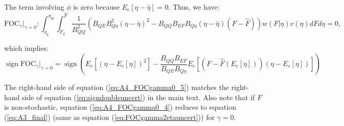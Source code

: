 \documentclass[12pt]{article}
\DeclareMathOperator{\sign}{sign}
\begin{document}
The term involving $\phi$ is zero because $E_c[\eta-\bar{\eta}]=0$. Thus, we have:
\begin{equation}
\text{FOC}_{\gamma}|_{\gamma=0}:\int_{\eta_L}^{\eta_H}\int_{F_L}^{\hat{F}}\frac{1}{B_{QQ}^2}\left(B_{QE}B_{Q\eta}^2(\eta-\bar{\eta})^2-B_{QQ}B_{EF}B_{Q\eta}(\eta-\bar{\eta})(F-\hat{F})\right)w(F|\eta)v(\eta)dFd\eta = 0, \label{eq:A4_FOCgamma0_4}
\end{equation}

which implies:
\begin{equation}
\sign{\text{FOC}_{\gamma}|_{\gamma=0}} = \sign{\left(E_c[(\eta-E_c[\eta])^2] - \frac{B_{QQ}B_{EF}}{B_{QE}B_{Q\eta}}E_c[(F-\hat{F}(E_c[\eta]))(\eta-E_c[\eta])]\right)} \label{eq:A4_FOCgamma0_5}
\end{equation}

The right-hand side of equation (\ref{eq:A4_FOCgamma0_5}) matches the right-hand side of equation (\ref{eq:signdoubleuncert}) in the main text. Also note that if $F$ is non-stochastic, equation (\ref{eq:A4_FOCgamma0_4}) reduces to equation (\ref{eq:A3_final}) (same as equation (\ref{eq:FOCgamma2etauncert})) for $\gamma=0$.
\end{document}
